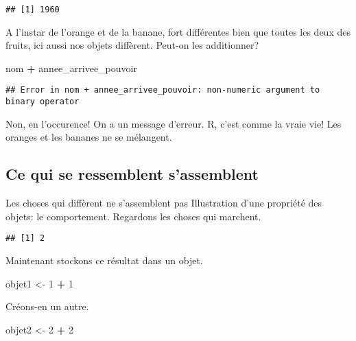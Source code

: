 \documentclass[]{book}
\newenvironment{Shaded}{\begin{snugshade}}{\end{snugshade}}
\newcommand{\DecValTok}[1]{\textcolor[rgb]{0.00,0.00,0.81}{#1}}
\newcommand{\StringTok}[1]{\textcolor[rgb]{0.31,0.60,0.02}{#1}}
\newcommand{\OperatorTok}[1]{\textcolor[rgb]{0.81,0.36,0.00}{\textbf{#1}}}
\newcommand{\NormalTok}[1]{#1}
\begin{document}
\begin{verbatim}
## [1] 1960
\end{verbatim}

A l'instar de l'orange et de la banane, fort différentes bien que toutes
les deux des fruits, ici aussi nos objets diffèrent. Peut-on les
additionner?

\begin{Shaded}
\begin{Highlighting}[]
\NormalTok{nom }\OperatorTok{+}\StringTok{ }\NormalTok{annee_arrivee_pouvoir}
\end{Highlighting}
\end{Shaded}

\begin{verbatim}
## Error in nom + annee_arrivee_pouvoir: non-numeric argument to binary operator
\end{verbatim}

Non, en l'occurence! On a un message d'erreur. R, c'est comme la vraie
vie! Les oranges et les bananes ne se mélangent.

\subsection{Ce qui se ressemblent
s'assemblent}\label{ce-qui-se-ressemblent-sassemblent}

Les choses qui diffèrent ne s'assemblent pas Illustration d'une
propriété des objets: le comportement. Regardons les choses qui
marchent.

\begin{verbatim}
## [1] 2
\end{verbatim}

Maintenant stockons ce résultat dans un objet.

\begin{Shaded}
\begin{Highlighting}[]
\NormalTok{objet1 <-}\StringTok{ }\DecValTok{1} \OperatorTok{+}\StringTok{ }\DecValTok{1}
\end{Highlighting}
\end{Shaded}

Créons-en un autre.

\begin{Shaded}
\begin{Highlighting}[]
\NormalTok{objet2 <-}\StringTok{ }\DecValTok{2} \OperatorTok{+}\StringTok{ }\DecValTok{2}
\end{Highlighting}
\end{Shaded}
\end{document}
